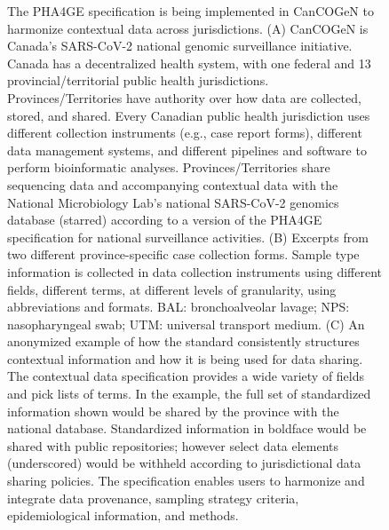\begin{figure}[h!]
\caption{The PHA4GE specification is being implemented in CanCOGeN to harmonize contextual data across jurisdictions. (A) CanCOGeN is Canada's SARS-CoV-2 national genomic surveillance initiative. Canada has a decentralized health system, with one federal and 13 provincial/territorial public health jurisdictions. Provinces/Territories have authority over how data are collected, stored, and shared. Every Canadian public health jurisdiction uses different collection instruments (e.g., case report forms), different data management systems, and different pipelines and software to perform bioinformatic analyses. Provinces/Territories share sequencing data and accompanying contextual data with the National Microbiology Lab's national SARS-CoV-2 genomics database (starred) according to a version of the PHA4GE specification for national surveillance activities. (B) Excerpts from two different province-specific case collection forms. Sample type information is collected in data collection instruments using different fields, different terms, at different levels of granularity, using abbreviations and formats. BAL: bronchoalveolar lavage; NPS: nasopharyngeal swab; UTM: universal transport medium. (C) An anonymized example of how the standard consistently structures contextual information and how it is being used for data sharing. The contextual data specification provides a wide variety of fields and pick lists of terms. In the example, the full set of standardized information shown would be shared by the province with the national database. Standardized information in boldface would be shared with public repositories; however select data elements (underscored) would be withheld according to jurisdictional data sharing policies. The specification enables users to harmonize and integrate data provenance, sampling strategy criteria, epidemiological information, and methods.}
\label{fig:chap7_figure_2}
\end{figure}